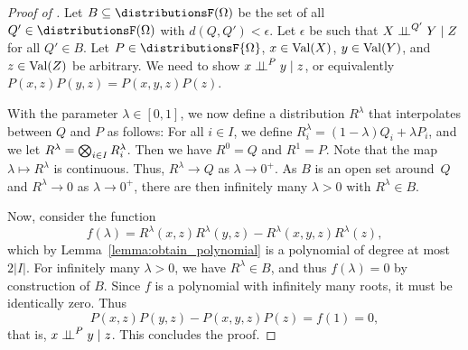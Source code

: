 \documentclass[USenglish,onecolumn]{article}
\begin{document}
\begin{proof}[Proof of ]
  Let $B\subseteq \distributionsF(\Omg)$ be the set of all $Q'\in\distributionsF(\Omg)$ with $d(Q, Q') < \epsilon$.
    Let $\epsilon$ be such that $X \mathrel{\perp\!\!\!\perp}^{Q'} Y \mid Z$ for all $Q'\in B$. Let $P\in \distributionsF{\factors}$, $x\in\textnormal{Val}(X)$, $y\in\textnormal{Val}(Y)$, and $z\in\textnormal{Val}(Z)$ be arbitrary.
  We need to show $x \mathrel{\perp\!\!\!\perp}^{P} y \mid z$, or equivalently $P(x, z)P(y, z) = P(x, y, z) P(z)$.

    With the parameter $\lambda\in[0,1]$, we now define a distribution $R^\lambda$ that interpolates between $Q$ and $P$ as follows:
    For all $i\in I$, we define $R^\lambda_i=(1-\lambda) Q_i+\lambda P_i$, and we let $R^\lambda=\bigotimes_{i\in I}  R^\lambda_i$.
    Then we have $R^0=Q$ and $R^1=P$.
    Note that the map $\lambda \mapsto R^{\lambda}$ is continuous.
    Thus, $R^\lambda\to Q$ as $\lambda\to 0^+$.
    As $B$ is an open set around~$Q$ and $R^{\lambda} \to 0$ as $\lambda \to 0^+$, there are then infinitely many $\lambda>0$ with $R^\lambda\in B$.
 
    Now, consider the function
    \begin{equation*}
      f(\lambda)=R^{\lambda} (x, z) R^{\lambda} (y, z) - R^{\lambda} (x, y , z) R^{\lambda} (z),
    \end{equation*}
    which by Lemma~\ref{lemma:obtain_polynomial} is a polynomial of degree at most $2 |I|$.
    For infinitely many $\lambda>0$, we have $R^\lambda\in B$, and thus $f(\lambda)=0$ by construction of $B$. Since $f$ is a polynomial with infinitely many roots, it must be identically zero.
    Thus
    \begin{equation*}
      P(x, z)P(y , z) - P(x , y , z) P(z) = f(1) = 0,
    \end{equation*}
    that is, $x \mathrel{\perp\!\!\!\perp}^{P} y \mid z$.
    This concludes the proof.
\end{proof}
\end{document}
